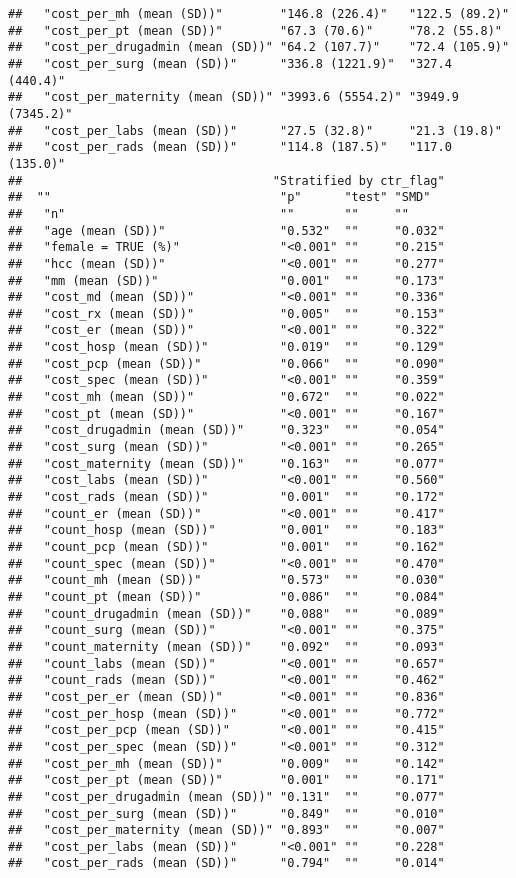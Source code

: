 \documentclass[]{article}
\begin{document}
\begin{verbatim}
##   "cost_per_mh (mean (SD))"        "146.8 (226.4)"   "122.5 (89.2)"   
##   "cost_per_pt (mean (SD))"        "67.3 (70.6)"     "78.2 (55.8)"    
##   "cost_per_drugadmin (mean (SD))" "64.2 (107.7)"    "72.4 (105.9)"   
##   "cost_per_surg (mean (SD))"      "336.8 (1221.9)"  "327.4 (440.4)"  
##   "cost_per_maternity (mean (SD))" "3993.6 (5554.2)" "3949.9 (7345.2)"
##   "cost_per_labs (mean (SD))"      "27.5 (32.8)"     "21.3 (19.8)"    
##   "cost_per_rads (mean (SD))"      "114.8 (187.5)"   "117.0 (135.0)"  
##                                   "Stratified by ctr_flag"
##  ""                                "p"      "test" "SMD"  
##   "n"                              ""       ""     ""     
##   "age (mean (SD))"                "0.532"  ""     "0.032"
##   "female = TRUE (%)"              "<0.001" ""     "0.215"
##   "hcc (mean (SD))"                "<0.001" ""     "0.277"
##   "mm (mean (SD))"                 "0.001"  ""     "0.173"
##   "cost_md (mean (SD))"            "<0.001" ""     "0.336"
##   "cost_rx (mean (SD))"            "0.005"  ""     "0.153"
##   "cost_er (mean (SD))"            "<0.001" ""     "0.322"
##   "cost_hosp (mean (SD))"          "0.019"  ""     "0.129"
##   "cost_pcp (mean (SD))"           "0.066"  ""     "0.090"
##   "cost_spec (mean (SD))"          "<0.001" ""     "0.359"
##   "cost_mh (mean (SD))"            "0.672"  ""     "0.022"
##   "cost_pt (mean (SD))"            "<0.001" ""     "0.167"
##   "cost_drugadmin (mean (SD))"     "0.323"  ""     "0.054"
##   "cost_surg (mean (SD))"          "<0.001" ""     "0.265"
##   "cost_maternity (mean (SD))"     "0.163"  ""     "0.077"
##   "cost_labs (mean (SD))"          "<0.001" ""     "0.560"
##   "cost_rads (mean (SD))"          "0.001"  ""     "0.172"
##   "count_er (mean (SD))"           "<0.001" ""     "0.417"
##   "count_hosp (mean (SD))"         "0.001"  ""     "0.183"
##   "count_pcp (mean (SD))"          "0.001"  ""     "0.162"
##   "count_spec (mean (SD))"         "<0.001" ""     "0.470"
##   "count_mh (mean (SD))"           "0.573"  ""     "0.030"
##   "count_pt (mean (SD))"           "0.086"  ""     "0.084"
##   "count_drugadmin (mean (SD))"    "0.088"  ""     "0.089"
##   "count_surg (mean (SD))"         "<0.001" ""     "0.375"
##   "count_maternity (mean (SD))"    "0.092"  ""     "0.093"
##   "count_labs (mean (SD))"         "<0.001" ""     "0.657"
##   "count_rads (mean (SD))"         "<0.001" ""     "0.462"
##   "cost_per_er (mean (SD))"        "<0.001" ""     "0.836"
##   "cost_per_hosp (mean (SD))"      "<0.001" ""     "0.772"
##   "cost_per_pcp (mean (SD))"       "<0.001" ""     "0.415"
##   "cost_per_spec (mean (SD))"      "<0.001" ""     "0.312"
##   "cost_per_mh (mean (SD))"        "0.009"  ""     "0.142"
##   "cost_per_pt (mean (SD))"        "0.001"  ""     "0.171"
##   "cost_per_drugadmin (mean (SD))" "0.131"  ""     "0.077"
##   "cost_per_surg (mean (SD))"      "0.849"  ""     "0.010"
##   "cost_per_maternity (mean (SD))" "0.893"  ""     "0.007"
##   "cost_per_labs (mean (SD))"      "<0.001" ""     "0.228"
##   "cost_per_rads (mean (SD))"      "0.794"  ""     "0.014"
\end{verbatim}
\end{document}
